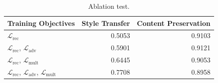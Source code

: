 \begin{table}[ht]
	\centering
	\begin{tabular}{| l | r | r |}
		\hline
		\textbf{Training Objectives}                                                  & \textbf{Style Transfer} & \textbf{Content Preservation} \\
		\hline
		\hline
		$\mathcal{L}_\text{rec}$                                                      & 0.5053                  & 0.9103                        \\
		\hline
		$\mathcal{L}_\text{rec}$, $\mathcal{L}_\text{adv}$                            & 0.5901                  & 0.9121                        \\
		\hline
		$\mathcal{L}_\text{rec}$, $\mathcal{L}_\text{mult}$                           & 0.6445                  & 0.9053                        \\
		\hline
		$\mathcal{L}_\text{rec}$, $\mathcal{L}_\text{adv}$, $\mathcal{L}_\text{mult}$ & 0.7708                  & 0.8958                        \\
		\hline
	\end{tabular}
	\caption{Ablation test.}
	\label{tab:ablation-results}
\end{table}



